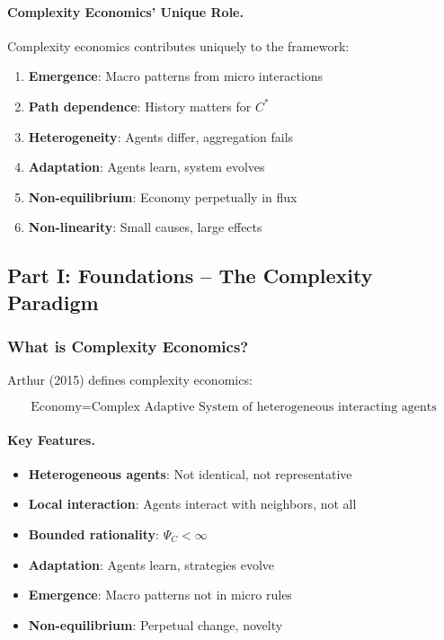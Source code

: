 \paragraph{Complexity Economics' Unique Role.}
Complexity economics contributes uniquely to the framework:
\begin{enumerate}
    \item \textbf{Emergence}: Macro patterns from micro interactions
    \item \textbf{Path dependence}: History matters for $C^*$
    \item \textbf{Heterogeneity}: Agents differ, aggregation fails
    \item \textbf{Adaptation}: Agents learn, system evolves
    \item \textbf{Non-equilibrium}: Economy perpetually in flux
    \item \textbf{Non-linearity}: Small causes, large effects
\end{enumerate}

\subsection{Part I: Foundations – The Complexity Paradigm}

\subsubsection{What is Complexity Economics?}

Arthur (2015) defines complexity economics:

\begin{equation}
\boxed{
\text{Economy} = \text{Complex Adaptive System of heterogeneous interacting agents}
}
\label{eq:complexity-def}
\end{equation}

\paragraph{Key Features.}
\begin{itemize}
    \item \textbf{Heterogeneous agents}: Not identical, not representative
    \item \textbf{Local interaction}: Agents interact with neighbors, not all
    \item \textbf{Bounded rationality}: $\Psi_C < \infty$
    \item \textbf{Adaptation}: Agents learn, strategies evolve
    \item \textbf{Emergence}: Macro patterns not in micro rules
    \item \textbf{Non-equilibrium}: Perpetual change, novelty
\end{itemize}

